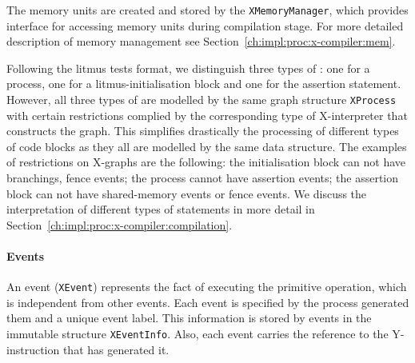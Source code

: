 The memory units are created and stored by the \texttt{XMemoryManager}, which provides interface for accessing memory units during compilation stage.
For more detailed description of memory management see Section~\ref{ch:impl:proc:x-compiler:mem}.

Following the litmus tests format, we distinguish three types of \xgraph{}: one for a process, one for a litmus-initialisation block and one for the assertion statement.
However, all three types of \xgraph{} are modelled by the same graph structure \texttt{XProcess} with certain restrictions complied by the corresponding type of X-interpreter that constructs the graph. %
This simplifies drastically the processing of different types of code blocks as they all are modelled by the same data structure.
The examples of restrictions on X-graphs are the following: the initialisation block can not have branchings, fence events; the process cannot have assertion events; the assertion block can not have shared-memory events or fence events.
We discuss the interpretation of different types of statements in more detail in Section~\ref{ch:impl:proc:x-compiler:compilation}.


\paragraph{Events}
\label{ch:impl:model:xgraph:evt}

An event (\texttt{XEvent}) represents the fact of executing the primitive operation, which is independent from other events.
Each event is specified by the process generated them and a unique event label.
This information is stored by events in the immutable structure \texttt{XEventInfo}.
Also, each event carries the reference to the Y-instruction that has generated it.

